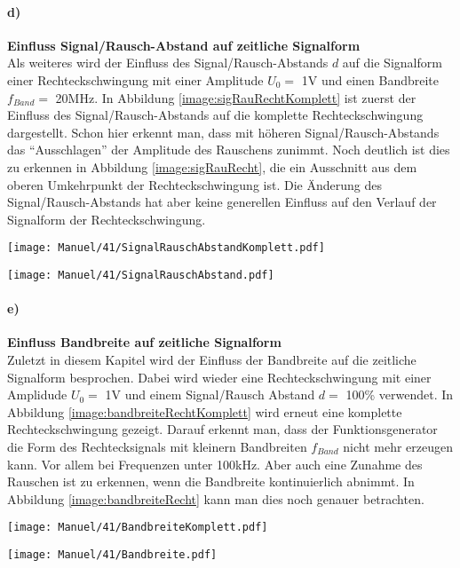 \paragraph{d)}\textbf{Einfluss Signal/Rausch-Abstand auf zeitliche Signalform}\\
Als weiteres wird der Einfluss des Signal/Rausch-Abstands $d$ auf die Signalform einer Rechteckschwingung mit einer Amplitude $U_0=$ 1V und einen Bandbreite $f_{Band}=$ 20MHz.
In Abbildung \ref{image:sigRauRechtKomplett} ist zuerst der Einfluss des Signal/Rausch-Abstands auf die komplette Rechteckschwingung dargestellt. Schon hier erkennt man, dass mit höheren Signal/Rausch-Abstands das \enquote{Ausschlagen} der Amplitude des Rauschens zunimmt. Noch deutlich ist dies zu erkennen in Abbildung \ref{image:sigRauRecht}, die ein Ausschnitt aus dem oberen Umkehrpunkt der Rechteckschwingung ist. Die Änderung des Signal/Rausch-Abstands hat aber keine generellen Einfluss auf den Verlauf der Signalform der Rechteckschwingung.
\newpage
\begin{center}
    \texttt{[image: Manuel/41/SignalRauschAbstandKomplett.pdf]}
    \label{image:sigRauRechtKomplett}
\end{center}
\begin{center}
    \texttt{[image: Manuel/41/SignalRauschAbstand.pdf]}
    \label{image:sigRauRecht}
\end{center}

\paragraph{e)}\textbf{Einfluss Bandbreite auf zeitliche Signalform}\\
Zuletzt in diesem Kapitel wird der Einfluss der Bandbreite auf die zeitliche Signalform besprochen. Dabei wird wieder eine Rechteckschwingung mit einer Amplidude $U_0=$ 1V und einem Signal/Rausch Abstand $d=$ 100\% verwendet. In Abbildung \ref{image:bandbreiteRechtKomplett} wird erneut eine komplette Rechteckschwingung gezeigt. Darauf erkennt man, dass der Funktionsgenerator die Form des Rechtecksignals mit kleinern Bandbreiten $f_{Band}$ nicht mehr erzeugen kann. Vor allem bei Frequenzen unter 100kHz. Aber auch eine Zunahme des Rauschen ist zu erkennen, wenn die Bandbreite kontinuierlich abnimmt. In Abbildung \ref{image:bandbreiteRecht} kann man dies noch genauer betrachten. 
\newpage
\begin{center}
    \texttt{[image: Manuel/41/BandbreiteKomplett.pdf]}
    \label{image:bandbreiteRechtKomplett}
\end{center}
\begin{center}
    \texttt{[image: Manuel/41/Bandbreite.pdf]}
    \label{image:bandbreiteRecht}
\end{center}